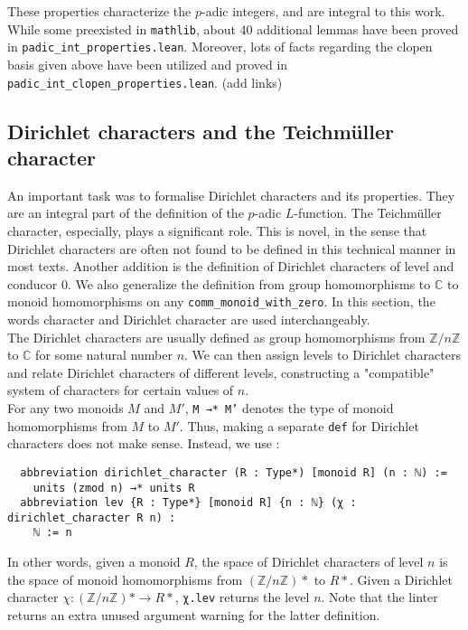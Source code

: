 \documentclass[a4paper,UKenglish,cleveref, autoref, thm-restate]{lipics-v2021}
\newcommand{\lean}[1]{\texttt{#1}\xspace} %
\begin{document}
These properties characterize the $p$-adic integers, and are integral to this work. While some preexisted in 
\lean{mathlib}, about 40 additional lemmas have been proved in \lean{padic\_int\_properties.lean}. 
Moreover, lots of facts regarding the clopen basis given above have been utilized and proved in \lean{padic\_int\_clopen\_properties.lean}. (add links)

\subsection{Dirichlet characters and the Teichmüller character}
An important task was to formalise Dirichlet characters and its properties. They are an integral part of the definition of the $p$-adic $L$-function. 
The Teichmüller character, especially, plays a significant role. This is novel, in the sense that Dirichlet characters are often not found to be defined 
in this technical manner in most texts. Another addition is the definition of Dirichlet characters of level and conducor 0. We also generalize the 
definition from group homomorphisms to $\mathbb{C}$ to monoid homomorphisms on any \lean{comm\_monoid\_with\_zero}. 
In this section, the words character and Dirichlet character are used interchangeably. \\

The Dirichlet characters are usually defined as group homomorphisms from $\mathbb{Z}/n \mathbb{Z}$ to $\mathbb{C}$ for some natural number $n$. 
We can then assign levels to Dirichlet characters and relate Dirichlet characters of different levels, constructing a "compatible" system of 
characters for certain values of $n$. \\

For any two monoids $M$ and $M'$, \lean{M →* M'} denotes the type of monoid homomorphisms from $M$ to $M'$. Thus, making a separate 
\lean{def} for Dirichlet characters does not make sense. Instead, we use :
\begin{lstlisting}
  abbreviation dirichlet_character (R : Type*) [monoid R] (n : ℕ) := 
    units (zmod n) →* units R
  abbreviation lev {R : Type*} [monoid R] {n : ℕ} (χ : dirichlet_character R n) : 
    ℕ := n
\end{lstlisting}

In other words, given a monoid $R$, the space of Dirichlet characters of level $n$ is the space of monoid homomorphisms from 
$(\mathbb{Z}/n \mathbb{Z})*$ to $R*$. Given a Dirichlet character $\chi : (\mathbb{Z}/n \mathbb{Z})* \to R*$, \lean{χ.lev} 
returns the level $n$. Note that the linter returns an extra unused argument warning for the latter definition. \\
\end{document}

